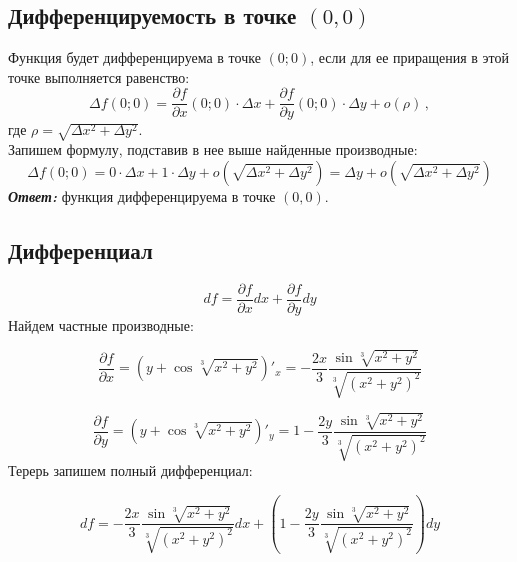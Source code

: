 \documentclass[a5paper, 10pt]{article}
\theoremstyle{definition}
\theoremstyle{plain}
\theoremstyle{remark}
\begin{document}
\subsection{Дифференцируемость в точке  $(0, 0)$}
Функция будет дифференцируема в точке $\left(0;0 \right)$, если для ее приращения в этой точке выполняется равенство:
\begin{equation}
\Delta f (0;0) = \frac{\partial f}{\partial x} (0;0) \cdot \Delta x +  \frac{\partial f}{\partial y} (0;0) \cdot \Delta y + o(\rho)\, ,
\end{equation}
где $\rho = \sqrt{\Delta x^2 + \Delta y^2}$.\\
Запишем формулу, подставив в нее выше найденные производные:
\begin{equation}
\Delta f (0;0) = 0 \cdot \Delta x +  1 \cdot \Delta y + o( \sqrt{\Delta x^2 + \Delta y^2}) = \Delta y + o( \sqrt{\Delta x^2 + \Delta y^2})
\end{equation}
\textit{\textbf{Ответ:}} функция дифференцируема в точке $(0, 0)$.

\subsection{Дифференциал}

\begin{equation}
df = \frac{\partial f}{\partial x} dx + \frac{\partial f}{\partial y} dy
\end{equation}
Найдем частные производные:

\begin{equation}
\frac{\partial f}{\partial x} = \left( y + \cos \sqrt[3]{x^2 + y^2} \right)'_x = -\frac{2x}{3} \frac{\sin \sqrt[3]{x^2 + y^2}}{\sqrt[3]{ \left( x^2 + y^2 \right)^2}}
\end{equation}

\begin{equation}
\frac{\partial f}{\partial y} = \left( y + \cos \sqrt[3]{x^2 + y^2} \right)'_y = 1 -\frac{2y}{3} \frac{\sin \sqrt[3]{x^2 + y^2}}{\sqrt[3]{ \left( x^2 + y^2 \right)^2}}
\end{equation}
Терерь запишем полный дифференциал:

\begin{equation}
df =  -\frac{2x}{3} \frac{\sin \sqrt[3]{x^2 + y^2}}{\sqrt[3]{ \left( x^2 + y^2 \right)^2}} dx + \left( 1 -\frac{2y}{3} \frac{\sin \sqrt[3]{x^2 + y^2}}{\sqrt[3]{ \left( x^2 + y^2 \right)^2}}  \right) dy
\end{equation}

\newpage
\end{document}
